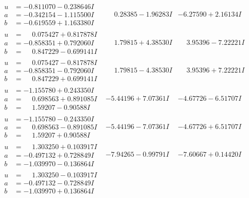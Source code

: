 \documentclass[1p]{elsarticle_modified}
\theoremstyle{definition}
\begin{document}
$$\begin{array}{c|c|c}
\begin{aligned}
u &= -0.811070 - 0.238646 I \\
a &= -0.342154 - 1.115500 I \\
b &= -0.619559 + 1.163380 I\end{aligned}
 & \phantom{-}0.28385 - 1.96283 I & -6.27590 + 2.16134 I \\ \hline\begin{aligned}
u &= \phantom{-}0.075427 + 0.817878 I \\
a &= -0.858351 + 0.792060 I \\
b &= \phantom{-}0.847229 - 0.699141 I\end{aligned}
 & \phantom{-}1.79815 + 4.38530 I & \phantom{-}3.95396 - 7.22221 I \\ \hline\begin{aligned}
u &= \phantom{-}0.075427 - 0.817878 I \\
a &= -0.858351 - 0.792060 I \\
b &= \phantom{-}0.847229 + 0.699141 I\end{aligned}
 & \phantom{-}1.79815 - 4.38530 I & \phantom{-}3.95396 + 7.22221 I \\ \hline\begin{aligned}
u &= -1.155780 + 0.243350 I \\
a &= \phantom{-}0.698563 + 0.891085 I \\
b &= \phantom{-}1.59207 - 0.90588 I\end{aligned}
 & -5.44196 + 7.07361 I & -4.67726 - 6.51707 I \\ \hline\begin{aligned}
u &= -1.155780 - 0.243350 I \\
a &= \phantom{-}0.698563 - 0.891085 I \\
b &= \phantom{-}1.59207 + 0.90588 I\end{aligned}
 & -5.44196 - 7.07361 I & -4.67726 + 6.51707 I \\ \hline\begin{aligned}
u &= \phantom{-}1.303250 + 0.103917 I \\
a &= -0.497132 + 0.728849 I \\
b &= -1.039970 - 0.136864 I\end{aligned}
 & -7.94265 - 0.99791 I & -7.60667 + 0.14420 I \\ \hline\begin{aligned}
u &= \phantom{-}1.303250 - 0.103917 I \\
a &= -0.497132 - 0.728849 I \\
b &= -1.039970 + 0.136864 I\end{aligned}

\end{array}$$
\end{document}
